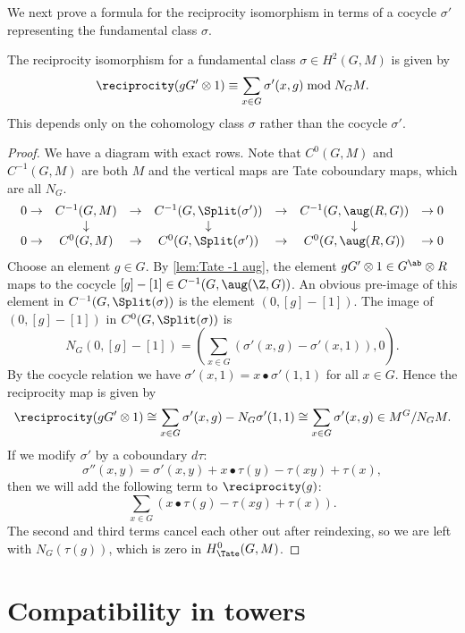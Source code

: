 We next prove a formula for the reciprocity isomorphism in terms of
a cocycle $\sigma'$ representing the fundamental class $\sigma$.

\begin{lemma} \label{lem:reciprocity formula}
	The reciprocity isomorphism for a fundamental class $\sigma \in H^2(G,M)$ is given by
	\[
		\reciprocity(gG' \otimes 1) \equiv  \sum_{x \in G} \sigma'(x,g) \bmod N_G M.
	\]
	This depends only on the cohomology class $\sigma$ rather than the cocycle $\sigma'$.
\end{lemma}

\begin{proof}
	We have a diagram with exact rows.
	Note that $C^0(G,M)$ and $C^{-1}(G,M)$ are both $M$
	and the vertical maps are Tate coboundary maps,
	which are all $N_G$.
	\[
		\begin{matrix}
			0 \to & C^{-1}(G,M) & \to & C^{-1}(G,\Split(\sigma')) & \to & C^{-1}(G,\aug(R,G)) & \to 0 \\
			&\downarrow &&\downarrow &&\downarrow \\
			0 \to & C^{0}(G,M) & \to & C^{0}(G,\Split(\sigma')) & \to & C^{0}(G,\aug(R,G)) & \to 0
		\end{matrix}
	\]
	Choose an element $g \in G$. By \ref{lem:Tate -1 aug},
	the element $gG' \otimes 1 \in G^{\ab} \otimes R$ maps to the cocycle
	$[g]-[1] \in C^{-1}(G,\aug(\Z,G))$.
	An obvious pre-image of this element in $C^{-1}(G,\Split(\sigma))$ is
	the element $(0,[g]-[1])$.
	The image of $(0,[g]-[1])$ in $C^{0}(G,\Split(\sigma))$ is
	\[
		N_G(0,[g]-[1])
		=
		\left(\sum_{x \in G} (\sigma'(x,g) - \sigma'(x,1)), 0\right).
	\]
	By the cocycle relation we have $\sigma'(x,1) = x \bullet \sigma'(1,1)$ for all $x\in G$.
	Hence the reciprocity map is given by
	\[
		\reciprocity(gG' \otimes 1)
		\cong \sum_{x \in G} \sigma'(x,g) - N_G \sigma'(1,1)
		\cong \sum_{x \in G} \sigma'(x,g)
		\in M^G / N_G M.
	\]
	If we modify $\sigma'$ by a coboundary $d\tau$:
	\[
		\sigma''(x,y) = \sigma'(x,y) + x \bullet \tau(y) - \tau(xy) + \tau(x),
	\]
	then we will add the following term to $\reciprocity(g)$:
	\[
		\sum_{x \in G} (x \bullet \tau(g) - \tau(xg) + \tau(x)).
	\]
	The second and third terms cancel each other out after reindexing, so we are
	left with $N_G(\tau(g))$, which is zero in $H^0_{\Tate}(G,M)$.
\end{proof}






\section{Compatibility in towers}

